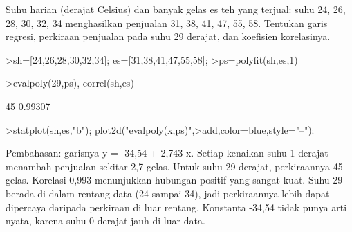 \documentclass[a4paper,10pt]{article}
\begin{document}
\begin{eulernotebook}
\begin{eulercomment}
\begin{eulercomment}
\begin{eulercomment}
\begin{eulercomment}
\begin{eulercomment}
\begin{eulercomment}
\begin{eulercomment}
\begin{eulercomment}
\begin{eulercomment}
\begin{eulercomment}
\begin{eulercomment}
\begin{eulercomment}
\begin{eulercomment}
\begin{eulercomment}
\begin{eulercomment}
\begin{eulercomment}
\begin{eulercomment}
\begin{eulercomment}
\begin{eulercomment}
\begin{eulercomment}
\begin{eulercomment}
\begin{eulercomment}
\begin{eulercomment}
\begin{eulercomment}
\begin{eulercomment}
\begin{eulercomment}
\begin{eulercomment}
\begin{eulercomment}
\begin{eulercomment}
\begin{eulercomment}
\begin{eulercomment}
\end{eulercomment}
\begin{eulercomment}
Suhu harian (derajat Celsius) dan banyak gelas es teh yang terjual: suhu 24, 26, 28, 30, 32,
34 menghasilkan penjualan 31, 38, 41, 47, 55, 58. Tentukan garis regresi, perkiraan
penjualan pada suhu 29 derajat, dan koefisien korelasinya.
\end{eulercomment}
\begin{eulerprompt}
>sh=[24,26,28,30,32,34]; es=[31,38,41,47,55,58];
>ps=polyfit(sh,es,1)
\end{eulerprompt}
\begin{euleroutput}
  [-34.543,  2.7429]
\end{euleroutput}
\begin{eulerprompt}
>evalpoly(29,ps), correl(sh,es)
\end{eulerprompt}
\begin{euleroutput}
  45
  0.99307
\end{euleroutput}
\begin{eulerprompt}
>statplot(sh,es,"b"); plot2d("evalpoly(x,ps)",>add,color=blue,style="--"):
\end{eulerprompt}
\begin{eulercomment}
Pembahasan: garisnya y = -34,54 + 2,743 x. Setiap kenaikan suhu 1 derajat menambah penjualan
sekitar 2,7 gelas. Untuk suhu 29 derajat, perkiraannya 45 gelas. Korelasi 0,993 menunjukkan
hubungan positif yang sangat kuat. Suhu 29 berada di dalam rentang data (24 sampai 34), jadi
perkiraannya lebih dapat dipercaya daripada perkiraan di luar rentang. Konstanta -34,54 tidak
punya arti nyata, karena suhu 0 derajat jauh di luar data.


\end{eulercomment}
\end{eulercomment}
\end{eulercomment}
\end{eulercomment}
\end{eulercomment}
\end{eulercomment}
\end{eulercomment}
\end{eulercomment}
\end{eulercomment}
\end{eulercomment}
\end{eulercomment}
\end{eulercomment}
\end{eulercomment}
\end{eulercomment}
\end{eulercomment}
\end{eulercomment}
\end{eulercomment}
\end{eulercomment}
\end{eulercomment}
\end{eulercomment}
\end{eulercomment}
\end{eulercomment}
\end{eulercomment}
\end{eulercomment}
\end{eulercomment}
\end{eulercomment}
\end{eulercomment}
\end{eulercomment}
\end{eulercomment}
\end{eulercomment}
\end{eulercomment}
\end{eulernotebook}
\end{document}
